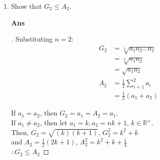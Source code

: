 \documentclass[paper=usletter, fontsize=12pt]{article}
\begin{document}
\begin{itemize}
\begin{itemize}
\begin{enumerate}
                \item Show that $G_2 \le A_2$.
                \item[\textbf{Ans}]
                \begin{proof}[\unskip\nopunct]
                    Substituting $n = 2$:
                    \vspace{-0.1in}
                    \begin{align*}
                        G_2 & = \sqrt[2]{a_{1}a_{2}\ldots a_{2}} \\
                        & = \sqrt[2]{a_{1}a_{2}} \\
                        & = \sqrt{a_{1}a_{2}} \\
                        A_2 & = \frac{1}{2}\sum_{i=1}^{2}a_i \\
                        & = \frac{1}{2}(a_1 + a_2)
                    \end{align*}

                    If $a_1 = a_2$, then $G_2 = a_1 = A_2 = a_1$. \\

                    If $a_1 \neq a_2$, then let $a_1 = k, a_2 = nk+ 1$, $k
                    \in \mathbb{R^{+}}$. \\ Then, $G_2 = \sqrt{(k)(k+1)}$,
                    $G_2^2 = k^2+k$ \\ and $A_2 = \frac{1}{2}(2k + 1)$, $A_2^2
                    = k^2 + k + \frac{1}{4}$ \\

                    $\therefore G_2 \le A_2$ \qedhere
                \end{proof}
                \vspace{0.2in}


\end{enumerate}
\end{itemize}
\end{itemize}
\end{document}
